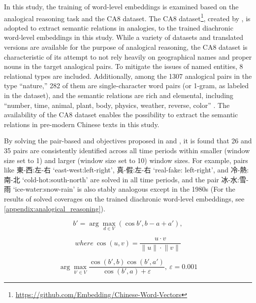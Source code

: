 In this study, the training of word-level embeddings is examined based on the analogical reasoning task and the CA8 dataset. The CA8 dataset\footnote{\url{https://github.com/Embedding/Chinese-Word-Vectors}}, created by \textcite{li2018analogical}, is adopted to extract semantic relations in analogies, to the trained diachronic word-level embeddings in this study. While a variety of datasets and translated versions are available for the purpose of analogical reasoning, the CA8 dataset is characteristic of its attempt to not rely heavily on geographical names and proper nouns in the target analogical pairs. To mitigate the issues of named entities, 8 relational types are included. Additionally, among the \num{1307} analogical pairs in the type ``nature,'' \num{282} of them are single-character word pairs (or 1-gram, as labeled in the dataset), and the semantic relations are rich and elemental, including ``number, time, animal, plant, body, physics, weather, reverse, color'' \parencite{li2018analogical}. The availability of the CA8 dataset enables the possibility to extract the semantic relations in pre-modern Chinese texts in this study.

By solving the pair-based  and  objectives \parencite{levy2014linguistic} proposed in  and , it is found that \num{26} and \num{35} pairs are consistently identified across all time periods within smaller (window size set to 1) and larger (window size set to 10) window sizes. For example, pairs like 東-西:左-右 `east-west:left-right', 真-假:左-右 `real-fake: left-right', and 冷-熱:南-北 `cold-hot:south-north' are solved in all time periods, and the pair 冰-水:雪-雨 `ice-water:snow-rain' is also stably analogous except in the 1980s (For the results of solved coverages on the trained diachronic word-level embeddings, see \ref{appendix:analogical_reasoning}).

\begin{equation}
  b' = \arg\max_{d \in V}(\cos b', b - a + a'){,}
  \label{equ:3cosadd}
\end{equation}

\begin{equation*}
  where\: \cos(u,v) = \frac{u \cdot v}{\lVert{u}\rVert \cdot \lVert{v}\rVert}
\end{equation*}

\begin{equation}
  \arg\max_{b' \in V}\frac{\cos(b',b) \cos(b',a')}{\cos(b',a) + \varepsilon}{,}\: \varepsilon = 0.001
  \label{equ:3cosmul}
\end{equation}


